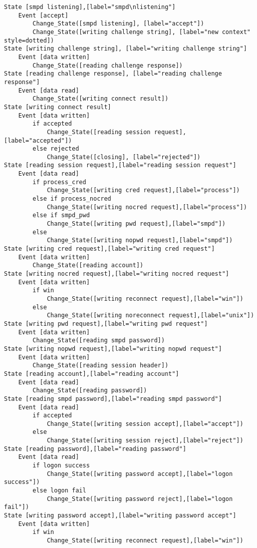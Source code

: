 \begin{comment}
This is the state machine for the smpd listener process.
Graph [smpd listener],
      [size="7.5, 10"]
\end{comment}
\begin{verbatim}
State [smpd listening],[label="smpd\nlistening"]
	Event [accept]
		Change_State([smpd listening], [label="accept"])
		Change_State([writing challenge string], [label="new context" style=dotted])
State [writing challenge string], [label="writing challenge string"]
	Event [data written]
		Change_State([reading challenge response])
State [reading challenge response], [label="reading challenge response"]
	Event [data read]
		Change_State([writing connect result])
State [writing connect result]
	Event [data written]
		if accepted
			Change_State([reading session request], [label="accepted"])
		else rejected
			Change_State([closing], [label="rejected"])
State [reading session request],[label="reading session request"]
	Event [data read]
		if process_cred
			Change_State([writing cred request],[label="process"])
		else if process_nocred
			Change_State([writing nocred request],[label="process"])
		else if smpd_pwd
			Change_State([writing pwd request],[label="smpd"])
		else
			Change_State([writing nopwd request],[label="smpd"])
State [writing cred request],[label="writing cred request"]
	Event [data written]
		Change_State([reading account])
State [writing nocred request],[label="writing nocred request"]
	Event [data written]
		if win
			Change_State([writing reconnect request],[label="win"])
		else
			Change_State([writing noreconnect request],[label="unix"])
State [writing pwd request],[label="writing pwd request"]
	Event [data written]
		Change_State([reading smpd password])
State [writing nopwd request],[label="writing nopwd request"]
	Event [data written]
		Change_State([reading session header])
State [reading account],[label="reading account"]
	Event [data read]
		Change_State([reading password])
State [reading smpd password],[label="reading smpd password"]
	Event [data read]
		if accepted
			Change_State([writing session accept],[label="accept"])
		else
			Change_State([writing session reject],[label="reject"])
State [reading password],[label="reading password"]
	Event [data read]
		if logon success
			Change_State([writing password accept],[label="logon success"])
		else logon fail
			Change_State([writing password reject],[label="logon fail"])
State [writing password accept],[label="writing password accept"]
	Event [data written]
		if win
			Change_State([writing reconnect request],[label="win"])

\end{verbatim}
